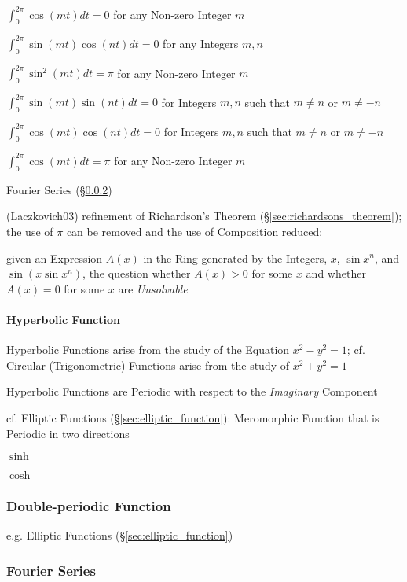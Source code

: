 $\int_0^{2\pi} \cos(mt)dt = 0$ for any Non-zero Integer $m$

$\int_0^{2\pi} \sin(mt)\cos(nt)dt = 0$ for any Integers $m,n$

$\int_0^{2\pi} \sin^2(mt)dt = \pi$ for any Non-zero Integer $m$

$\int_0^{2\pi} \sin(mt)\sin(nt)dt = 0$ for Integers $m,n$ such that $m\neq{n}$
or $m\neq{-n}$

$\int_0^{2\pi} \cos(mt)\cos(nt)dt = 0$ for Integers $m,n$ such that $m\neq{n}$
or $m\neq{-n}$

$\int_0^{2\pi} \cos(mt)dt = \pi$ for any Non-zero Integer $m$

\fist Fourier Series (\S\ref{sec:fourier_series})

(Laczkovich03) refinement of Richardson's Theorem
(\S\ref{sec:richardsons_theorem}); the use of $\pi$ can be removed and the use
of Composition reduced:

given an Expression $A(x)$ in the Ring generated by the Integers, $x$, $\sin
x^n$, and $\sin(x \sin x^n)$, the question whether $A(x) > 0$ for some $x$ and
whether $A(x) = 0$ for some $x$ are \emph{Unsolvable}



\paragraph{Hyperbolic Function}\label{sec:hyperbolic_function}\hfill

Hyperbolic Functions arise from the study of the Equation $x^2 - y^2 = 1$; cf.
Circular (Trigonometric) Functions arise from the study of $x^2 + y^2 = 1$

Hyperbolic Functions are Periodic with respect to the \emph{Imaginary}
Component

cf. Elliptic Functions (\S\ref{sec:elliptic_function}): Meromorphic Function
that is Periodic in two directions

$\sinh$

$\cosh$



\subsubsection{Double-periodic Function}\label{sec:double_periodic}

e.g. Elliptic Functions (\S\ref{sec:elliptic_function})



\subsubsection{Fourier Series}\label{sec:fourier_series}

